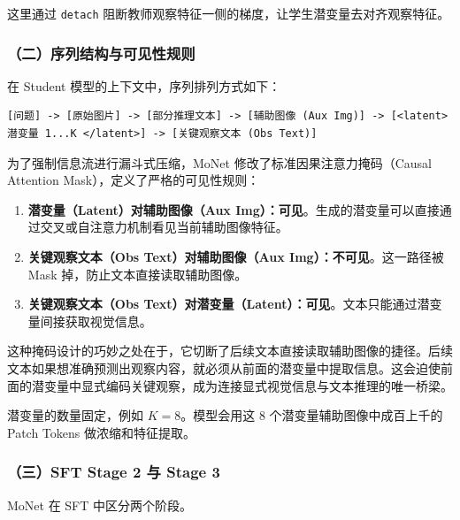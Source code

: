 这里通过 \texttt{detach} 阻断教师观察特征一侧的梯度，让学生潜变量去对齐观察特征。

\hypertarget{ux4e8cux5e8fux5217ux7ed3ux6784ux4e0eux53efux89c1ux6027ux89c4ux5219}{%
\subsubsection{（二）序列结构与可见性规则}\label{ux4e8cux5e8fux5217ux7ed3ux6784ux4e0eux53efux89c1ux6027ux89c4ux5219}}

在 Student 模型的上下文中，序列排列方式如下：

\begin{verbatim}
[问题] -> [原始图片] -> [部分推理文本] -> [辅助图像 (Aux Img)] -> [<latent> 潜变量 1...K </latent>] -> [关键观察文本 (Obs Text)]
\end{verbatim}

为了强制信息流进行漏斗式压缩，MoNet 修改了标准因果注意力掩码（Causal Attention Mask），定义了严格的可见性规则：

\begin{enumerate}
\def\labelenumi{\arabic{enumi}.}
\tightlist
\item
  \textbf{潜变量（Latent）对辅助图像（Aux Img）：可见}。生成的潜变量可以直接通过交叉或自注意力机制看见当前辅助图像特征。
\item
  \textbf{关键观察文本（Obs Text）对辅助图像（Aux Img）：不可见}。这一路径被 Mask 掉，防止文本直接读取辅助图像。
\item
  \textbf{关键观察文本（Obs Text）对潜变量（Latent）：可见}。文本只能通过潜变量间接获取视觉信息。
\end{enumerate}

这种掩码设计的巧妙之处在于，它切断了后续文本直接读取辅助图像的捷径。后续文本如果想准确预测出观察内容，就必须从前面的潜变量中提取信息。这会迫使前面的潜变量中显式编码关键观察，成为连接显式视觉信息与文本推理的唯一桥梁。

潜变量的数量固定，例如 \(K=8\)。模型会用这 8 个潜变量辅助图像中成百上千的 Patch Tokens 做浓缩和特征提取。

\hypertarget{ux4e09sft-stage-2-ux4e0e-stage-3}{%
\subsubsection{（三）SFT Stage 2 与 Stage 3}\label{ux4e09sft-stage-2-ux4e0e-stage-3}}

MoNet 在 SFT 中区分两个阶段。

